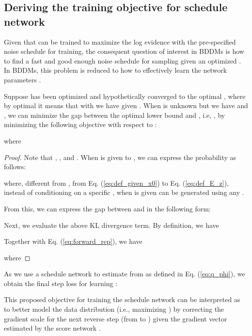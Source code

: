 \subsection{Deriving the training objective for schedule network}
\label{proof:scheduling_network_loss}
Given that  can be trained to maximize the log evidence with the pre-specified noise schedule  for training, the consequent question of interest in BDDMs is how to find a fast and good enough noise schedule  for sampling given an optimized . In BDDMs, this problem is reduced to how to effectively learn the network parameters  .
\begin{proposition}
\label{prop:phi}
Suppose  has been optimized and hypothetically converged to the optimal , where by optimal it means that with  we have  given . When  is unknown but we have  and , we can minimize the gap between the optimal lower bound  and , i.e, , by minimizing the following objective with respect to :

where



\end{proposition}
\begin{proof}
Note that , ,  and . When  is given to , we can express the probability as follows:

where, different from , from Eq. (\ref{eq:def_given_x0}) to Eq. (\ref{eq:def_E_z}), instead of conditioning on a specific , when  is given  can be generated using any .

From this, we can express the gap between  and  in the following form:

Next, we evaluate the above KL divergence term. By definition, we have

Together with Eq. (\ref{eq:forward_rep}), we have

where

\end{proof}
As we use a schedule network  to estimate  from  as defined in Eq. (\ref{eq:q_phi}), we obtain the final step loss for learning :


This proposed objective for training the schedule network can be interpreted as to better model the data distribution (i.e., maximizing ) by correcting the gradient scale  for the next reverse step (from  to ) given the gradient vector  estimated by the score network .

























